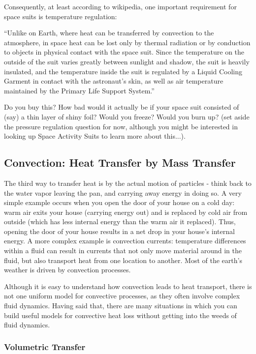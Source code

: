 \documentclass[10pt]{book}
\begin{document}
Consequently,  at least according to wikipedia, one important requirement for space suits is  temperature regulation:

``Unlike on Earth, where heat can be transferred by convection to the atmosphere, in space heat can be lost only by thermal radiation or by conduction to objects in physical contact with the space suit. Since the temperature on the outside of the suit varies greatly between sunlight and shadow, the suit is heavily insulated, and the temperature inside the suit is regulated by a Liquid Cooling Garment in contact with the astronaut's skin, as well as air temperature maintained by the Primary Life Support System.''

Do you buy this?  How bad would it actually be if your space suit consisted of (say) a thin layer of shiny foil?  Would you freeze?  Would you burn up?  (set aside the pressure regulation question for now, although you might be interested in looking up Space Activity Suits to learn more about this...). 

\subsection{Convection: Heat Transfer by Mass Transfer}

The third way to transfer heat is by the actual motion of particles - think back to the water vapor leaving the pan, and carrying away energy in doing so.  A very simple example occurs when you open the door of your house on a cold day: warm air exits your house (carrying energy out) and is replaced by cold air from outside (which has less internal energy than the warm air it replaced).  Thus, opening the door of your house results in a net drop in your house's internal energy.  A more complex example is convection currents: temperature differences within a fluid can result in currents that not only move material around in the fluid, but also transport heat from one location to another. Most of the earth's weather is driven by convection processes.

Although it is easy to understand how convection leads to heat transport, there is not one uniform model for convective processes, as they often involve complex fluid dynamics.  Having said that, there are many situations in which you can build useful models for convective heat loss without getting into the weeds of fluid dynamics.

\subsubsection{Volumetric Transfer}
\end{document}
